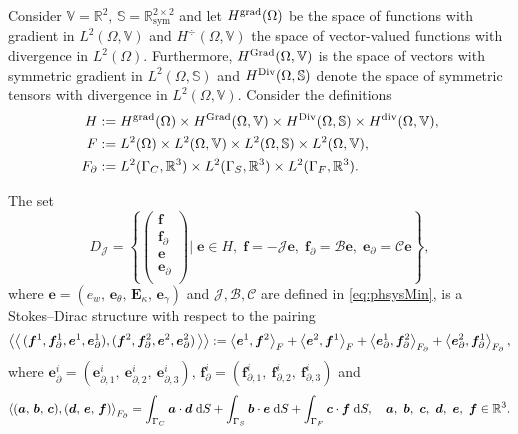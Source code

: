 \begin{theorem}\label{th:stdirMin}
Consider $\mathbb{V} = \mathbb{R}^2, \, \mathbb{S} = \mathbb{R}^{2\times 2}_{\text{sym}}$ and
let $H^{\grad}(\Omega)$ be the space of functions with gradient in $L^2(\Omega, \mathbb{V})$ and $H^{\div}  (\Omega, \mathbb{V})$ the space of vector-valued functions with divergence in $L^2(\Omega)$. Furthermore, $H^{\Grad}(\Omega, \mathbb{V})$ is the space of vectors with symmetric gradient in $L^2(\Omega, \mathbb{S})$ and $H^{\Div}  (\Omega, \mathbb{S})$ denote the space of symmetric tensors with divergence in $L^2(\Omega, \mathbb{V})$. Consider the definitions 
\begin{align*}
H &:= H^{\grad}(\Omega) \times H^{\Grad}(\Omega, \mathbb{V}) \times H^{\Div}(\Omega, \mathbb{S}) \times H^{\div}(\Omega, \mathbb{V}), \\
F &:= L^2(\Omega) \times L^2(\Omega, \mathbb{V}) \times L^2(\Omega, \mathbb{S}) \times L^2(\Omega, \mathbb{V}), \\
F_\partial &:= L^2(\Gamma_C, \mathbb{R}^3) \times L^2(\Gamma_S, \mathbb{R}^3) \times L^2(\Gamma_F, \mathbb{R}^3). 
\end{align*}

The set 
\begin{equation}
{D}_{\mathcal{J}} = \left\{
\begin{pmatrix}
\bm{f} \\ \bm{f}_\partial \\ \bm{e} \\ \bm{e}_\partial \\
\end{pmatrix}
\vert \;
\bm{e} \in H, \; \bm{f} = -\mathcal{J} \bm{e}, \;\bm{f}_\partial = \mathcal{B}\bm{e}, \; \bm{e}_\partial = \mathcal{C}\bm{e}   \right\},
\end{equation}
where $\bm{e} = ({e}_w, \,\bm{e}_\theta, \, \bm{E}_\kappa, \, \bm{e}_\gamma)$ and $\mathcal{J, B, C}$ are defined in \eqref{eq:phsysMin}, is a Stokes–Dirac structure with respect to the pairing
\begin{equation}\label{eq:bilinearMin}
\bilprod{(\bm{f}^1, \bm{f}_{\partial}^1, \bm{e}^1, \bm{e}_{\partial}^1)}{(\bm{f}^2, \bm{f}_{\partial}^2, \bm{e}^2, \bm{e}_{\partial}^2)}  := \inner[F]{\bm{e}^1}{\bm{f}^2} + \inner[F]{\bm{e}^2}{\bm{f}^1} + \inner[F_\partial]{\bm{e}_{\partial}^1}{\bm{f}_{\partial}^2} + \inner[F_\partial]{\bm{e}_{\partial}^2}{\bm{f}_{\partial}^1},
\end{equation}
where $\bm{e}_{\partial}^i = (\bm{e}_{\partial, 1}^i, \ \bm{e}_{\partial, 2}^i, \ \bm{e}_{\partial, 3}^i), \, \bm{f}_{\partial}^i = (\bm{f}_{\partial, 1}^i, \ \bm{f}_{\partial, 2}^i, \ \bm{f}_{\partial, 3}^i)$ and
\begin{equation*}
\inner[F_\partial]{(\bm{a}, \, \bm{b}, \, \bm{c})}{(\bm{d}, \, \bm{e}, \, \bm{f})} = \int_{\Gamma_C} \bm{a} \cdot \bm{d} \d{S} + \int_{\Gamma_S} \bm{b} \cdot \bm{e} \d{S}  + \int_{\Gamma_F} \bm{c} \cdot \bm{f} \d{S}, \quad \bm{a},\ \bm{b},\ \bm{c},\ \bm{d},\ \bm{e},\ \bm{f} \in \mathbb{R}^3. 
\end{equation*}


\end{theorem}
